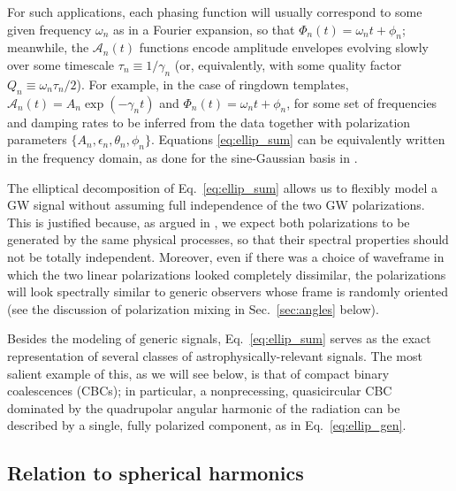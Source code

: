 \documentclass[aps,prd,twocolumn,superscriptaddress,preprintnumbers,floatfix,nofootinbib]{revtex4-2}
\newcommand*{\eq}[1]{Eq.~\eqref{eq:#1}}
\begin{document}
For such applications, each phasing function will usually correspond to some given frequency $\omega_n$ as in a Fourier expansion, so that $\Phi_n(t) = \omega_n t + \phi_n$; meanwhile, the $\mathcal{A}_n(t)$ functions encode amplitude envelopes evolving slowly over some timescale $\tau_n \equiv 1/\gamma_n$ (or, equivalently, with some quality factor $Q_n \equiv \omega_n \tau_n/2$).
For example, in the case of ringdown templates, $\mathcal{A}_n(t) = A_n \exp(-\gamma_n t)$ and $\Phi_n(t) = \omega_n t + \phi_n$, for some set of frequencies and damping rates to be inferred from the data together with polarization parameters $\{ A_n, \epsilon_n, \theta_n, \phi_n\}$.
Equations \eqref{eq:ellip_sum} can be equivalently written in the frequency domain, as done for the sine-Gaussian basis in \cite{Cornish:2014kda,Cornish:2020dwh}.

The elliptical decomposition of Eq.~\eqref{eq:ellip_sum} allows us to flexibly model a GW signal without assuming full independence of the two GW polarizations.
This is justified because, as argued in \cite{Chatziioannou:2021mij}, we expect both polarizations to be generated by the same physical processes, so that their spectral properties should not be totally independent.
Moreover, even if there was a choice of waveframe in which the two linear polarizations looked completely dissimilar, the polarizations will look spectrally similar to generic observers whose frame is randomly oriented (see the discussion of polarization mixing in Sec.~\ref{sec:angles} below).

Besides the modeling of generic signals, \eq{ellip_sum} serves as the exact representation of several classes of astrophysically-relevant signals.
The most salient example of this, as we will see below, is that of compact binary coalescences (CBCs); in particular, a nonprecessing, quasicircular CBC dominated by the quadrupolar angular harmonic of the radiation can be described by a single, fully polarized component, as in \eq{ellip_gen}.



\subsection{Relation to spherical harmonics}
\label{sec:harmonics}
\end{document}
